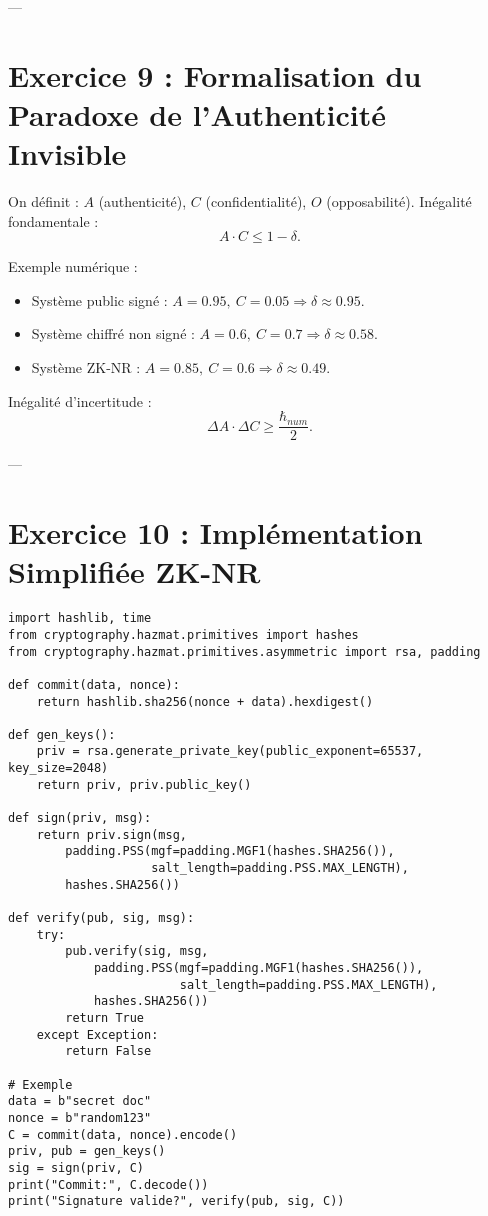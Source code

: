 \documentclass[memoire, 12pt]{report}
\begin{document}
\begin{titlepage}
---

\section*{Exercice 9 : Formalisation du Paradoxe de l’Authenticité Invisible}

On définit : $A$ (authenticité), $C$ (confidentialité), $O$ (opposabilité).  
Inégalité fondamentale :
\[
A \cdot C \le 1 - \delta.
\]

Exemple numérique :
\begin{itemize}
  \item Système public signé : $A=0.95,\ C=0.05 \Rightarrow \delta \approx 0.95$.
  \item Système chiffré non signé : $A=0.6,\ C=0.7 \Rightarrow \delta \approx 0.58$.
  \item Système ZK-NR : $A=0.85,\ C=0.6 \Rightarrow \delta \approx 0.49$.
\end{itemize}

Inégalité d’incertitude :
\[
\Delta A \cdot \Delta C \geq \frac{\hbar_{num}}{2}.
\]

---

\section*{Exercice 10 : Implémentation Simplifiée ZK-NR}

\begin{lstlisting}[style=python, caption={Prototype pédagogique de ZK-NR en Python}]
import hashlib, time
from cryptography.hazmat.primitives import hashes
from cryptography.hazmat.primitives.asymmetric import rsa, padding

def commit(data, nonce):
    return hashlib.sha256(nonce + data).hexdigest()

def gen_keys():
    priv = rsa.generate_private_key(public_exponent=65537, key_size=2048)
    return priv, priv.public_key()

def sign(priv, msg):
    return priv.sign(msg,
        padding.PSS(mgf=padding.MGF1(hashes.SHA256()),
                    salt_length=padding.PSS.MAX_LENGTH),
        hashes.SHA256())

def verify(pub, sig, msg):
    try:
        pub.verify(sig, msg,
            padding.PSS(mgf=padding.MGF1(hashes.SHA256()),
                        salt_length=padding.PSS.MAX_LENGTH),
            hashes.SHA256())
        return True
    except Exception:
        return False

# Exemple
data = b"secret doc"
nonce = b"random123"
C = commit(data, nonce).encode()
priv, pub = gen_keys()
sig = sign(priv, C)
print("Commit:", C.decode())
print("Signature valide?", verify(pub, sig, C))
\end{lstlisting}


\end{titlepage}
\end{document}
